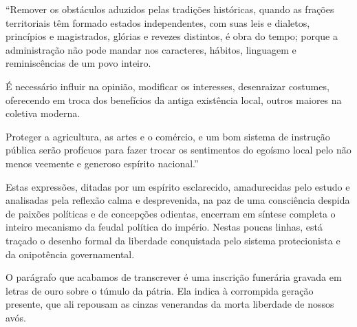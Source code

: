 ``Remover os obstáculos aduzidos pelas tradições históricas, quando as
frações territoriais têm formado estados independentes, com suas leis e
dialetos, princípios e magistrados, glórias e revezes distintos, é obra
do tempo; porque a administração não pode mandar nos caracteres,
hábitos, linguagem e reminiscências de um povo inteiro.

É necessário influir na opinião, modificar os interesses, desenraizar
costumes, oferecendo em troca dos benefícios da antiga existência local,
outros maiores na coletiva moderna.

Proteger a agricultura, as artes e o comércio, e um bom sistema de
instrução pública serão profícuos para fazer trocar os sentimentos do
egoísmo local pelo não menos veemente e generoso espírito nacional.''

Estas expressões, ditadas por um espírito esclarecido, amadurecidas pelo
estudo e analisadas pela reflexão calma e desprevenida, na paz de uma
consciência despida de paixões políticas e de concepções odientas,
encerram em síntese completa o inteiro mecanismo da feudal política do
império. Nestas poucas linhas, está traçado o desenho formal da
liberdade conquistada pelo sistema protecionista e da onipotência
governamental.

O parágrafo que acabamos de transcrever é uma inscrição funerária
gravada em letras de ouro sobre o túmulo da pátria. Ela indica à
corrompida geração presente, que ali repousam as cinzas venerandas da
morta liberdade de nossos avós.

